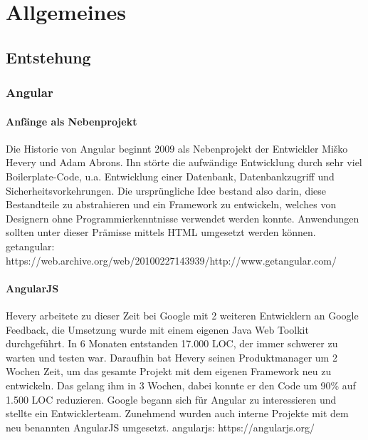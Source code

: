 \chapter{Allgemeines}

\section{Entstehung}

\subsection{Angular}
\subsubsection{Anfänge als Nebenprojekt}
Die Historie von Angular beginnt 2009 als Nebenprojekt der Entwickler Miško Hevery und Adam Abrons. Ihn störte die aufwändige Entwicklung durch sehr viel Boilerplate-Code, u.a. Entwicklung einer Datenbank, Datenbankzugriff und Sicherheitsvorkehrungen.
Die ursprüngliche Idee bestand also darin, diese Bestandteile zu abstrahieren und ein Framework zu entwickeln, welches von Designern ohne Programmierkenntnisse verwendet werden konnte. Anwendungen sollten unter dieser Prämisse mittels HTML umgesetzt werden können. getangular: https://web.archive.org/web/20100227143939/http://www.getangular.com/

\subsubsection{AngularJS}
Hevery arbeitete zu dieser Zeit bei Google mit 2 weiteren Entwicklern an Google Feedback, die Umsetzung wurde mit einem eigenen Java Web Toolkit durchgeführt. In 6 Monaten entstanden 17.000 LOC, der immer schwerer zu warten und testen war. Daraufhin bat Hevery seinen Produktmanager um 2 Wochen Zeit, um das gesamte Projekt mit dem eigenen Framework neu zu entwickeln. Das gelang ihm in 3 Wochen, dabei konnte er den Code um 90\% auf 1.500 LOC reduzieren. Google begann sich für Angular zu interessieren und stellte ein Entwicklerteam. Zunehmend wurden auch interne Projekte mit dem neu benannten AngularJS umgesetzt.\cite{yt_ngConf2014} angularjs: https://angularjs.org/ 


